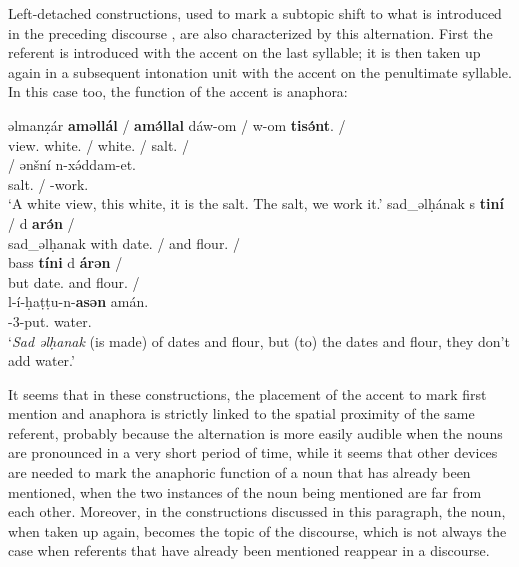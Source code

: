 \documentclass[output=paper]{langsci/langscibook}
\begin{document}
Left-detached constructions, used to mark a subtopic shift to what is introduced in the preceding discourse \citep[][278]{mettouchi:schiattarella:18}, are also characterized by this alternation. First the referent is introduced with the accent on the last syllable; it is then taken up again in a subsequent intonation unit with the accent on the penultimate syllable. In this case too, the function of the accent is anaphora:

\begin{exe}
\ex\label{5ex:46}
\gll	əlmanẓár	{\bf{aməllál}}	/	{\bf{amə́llal}}	dáw-om	/	w-om	{\bf{tisə́nt}}.	/ \\
	view.{}		white.{}	/	white.{}	{\sc{dem-2sg.f}}	/  {}	salt.{}	/\\
\glt
\exi{}
	/	ənšní	n-xə́ddam-et. \\
	salt.{}	/	{}	{}-work.{} \\
\glt	`A white view, this white, it is the salt. The salt, we work it.'
\ex\label{5ex:47}
\gll	sad\_əlḥának	s	{\bf{tiní}}	/	d	{\bf{arə́n}}	/ \\
	sad\_əlḥanak	with	date.{}	/	and	flour.{}	/ \\
\glt
\exi{}
\gll	bass	{\bf{tíni}}	d	{\bf{árən}}	/ \\
	but	date.{}	and	flour.{}	/ \\
\glt
\exi{}
\gll	l-í-ḥaṭṭu-n-{\bf{asən}}	amán.\\
	{}-3-put.{}	water.{} \\
\glt	`{\emph{Sad əlḥanak}} (is made) of dates and flour, but (to) the dates and flour, they don't add water.'
\end{exe}

It seems that in these constructions, the placement of the accent to mark first mention and anaphora is strictly linked to the spatial proximity of the same referent, probably because the alternation is more easily audible when the nouns are pronounced in a very short period of time, while it seems that other devices are needed to mark the anaphoric function of a noun that has already been mentioned, when the two instances of the noun being mentioned are far from each other. Moreover, in the constructions discussed in this paragraph, the noun, when taken up again, becomes the topic of the discourse, which is not always the case when referents that have already been mentioned reappear in a discourse.
\end{document}
